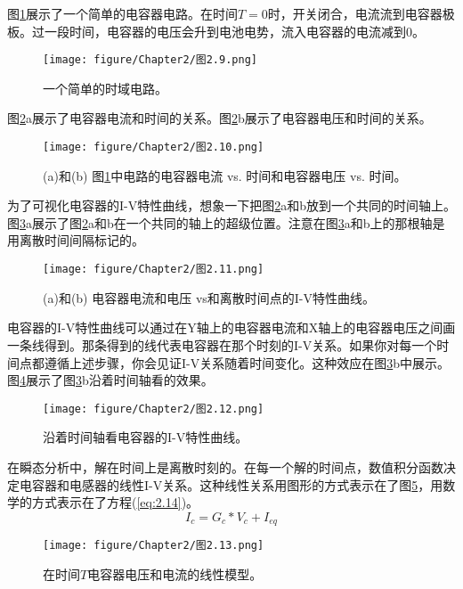 图\ref{图2.9}展示了一个简单的电容器电路。在时间$T=0$时，开关闭合，电流流到电容器极板。过一段时间，电容器的电压会升到电池电势，流入电容器的电流减到0。
\begin{figure}[htbp]
\small
    \centering
    \texttt{[image: figure/Chapter2/图2.9.png]}
    \caption{一个简单的时域电路。}
    \label{图2.9}
\end{figure}
图\ref{图2.10}a展示了电容器电流和时间的关系。图\ref{图2.10}b展示了电容器电压和时间的关系。
\begin{figure}[htbp]
\small
    \centering
    \texttt{[image: figure/Chapter2/图2.10.png]}
    \caption{(a)和(b) 图\ref{图2.9}中电路的电容器电流 vs. 时间和电容器电压 vs. 时间。}
    \label{图2.10}
\end{figure}

为了可视化电容器的I-V特性曲线，想象一下把图\ref{图2.10}a和b放到一个共同的时间轴上。图\ref{图2.11}a展示了图\ref{图2.10}a和b在一个共同的轴上的超级位置。注意在图\ref{图2.11}a和b上的那根轴是用离散时间间隔标记的。
\begin{figure}[htbp]
\small
    \centering
    \texttt{[image: figure/Chapter2/图2.11.png]}
    \caption{(a)和(b) 电容器电流和电压 vs和离散时间点的I-V特性曲线。}
    \label{图2.11}
\end{figure}
电容器的I-V特性曲线可以通过在Y轴上的电容器电流和X轴上的电容器电压之间画一条线得到。那条得到的线代表电容器在那个时刻的I-V关系。如果你对每一个时间点都遵循上述步骤，你会见证I-V关系随着时间变化。这种效应在图\ref{图2.11}b中展示。图\ref{图2.12}展示了图\ref{图2.11}b沿着时间轴看的效果。
\begin{figure}[htbp]
\small
    \centering
    \texttt{[image: figure/Chapter2/图2.12.png]}
    \caption{沿着时间轴看电容器的I-V特性曲线。}
    \label{图2.12}
\end{figure}

在瞬态分析中，解在时间上是离散时刻的。在每一个解的时间点，数值积分函数决定电容器和电感器的线性I-V关系。这种线性关系用图形的方式表示在了图\ref{图2.13}，用数学的方式表示在了方程(\ref{eq:2.14})。
\begin{equation}
    I_c = G_c * V_c + I_{eq}
    \label{eq:2.14}
\end{equation}
\begin{figure}[htbp]
\small
    \centering
    \texttt{[image: figure/Chapter2/图2.13.png]}
    \caption{在时间$T$电容器电压和电流的线性模型。}
    \label{图2.13}
\end{figure}

